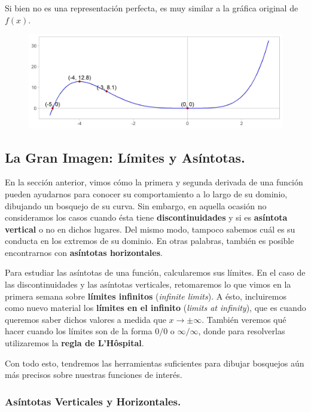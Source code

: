 \documentclass[12pt]{article}
\begin{document}
Si bien no es una representación perfecta, es muy similar a la gráfica original de $f(x)$.

\begin{figure}[hbt!]
\centering
\includegraphics[scale=0.7]{img/final_draft_original.jpg}
\end{figure}

\newpage


\subsection{La Gran Imagen: Límites y Asíntotas.}

En la sección anterior, vimos cómo la primera y segunda derivada de una función pueden ayudarnos para conocer su comportamiento a lo largo de su dominio, dibujando un bosquejo de su curva. Sin embargo, en aquella ocasión no consideramos los casos cuando ésta tiene \textbf{discontinuidades} y si es \textbf{asíntota vertical} o no en dichos lugares. Del mismo modo, tampoco sabemos cuál es su conducta en los extremos de su dominio. En otras palabras, también es posible encontrarnos con \textbf{asíntotas horizontales}.

Para estudiar las asíntotas de una función, calcularemos sus límites. En el caso de las discontinuidades y las asíntotas verticales, retomaremos lo que vimos en la primera semana sobre \textbf{límites infinitos} (\textit{infinite limits}). A ésto, incluiremos como nuevo material los \textbf{límites en el infinito} (\textit{limits at infinity}), que es cuando queremos saber dichos valores a medida que $x \to \pm \infty$. También veremos qué hacer cuando los límites son de la forma $0/0$ o $\infty/\infty$, donde para resolverlas utilizaremos la \textbf{regla de L'Hôspital}.

Con todo esto, tendremos las herramientas suficientes para dibujar bosquejos aún más precisos sobre nuestras funciones de interés.


\subsubsection{Asíntotas Verticales y Horizontales.}
\end{document}
